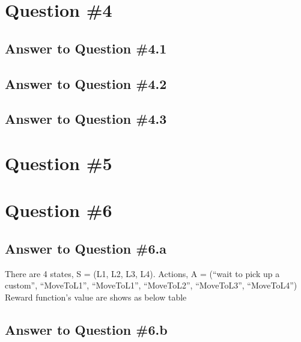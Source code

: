 \documentclass[conference]{styles/acmsiggraph}
\begin{document}
\section{Question \#4}

\subsection{Answer to Question \#4.1}

\subsection{Answer to Question \#4.2}

\subsection{Answer to Question \#4.3}

\section{Question \#5}

\section{Question \#6}

\subsection{Answer to Question \#6.a}

There are 4 states, S = (L1, L2, L3, L4).
Actions, A = (“wait to pick up a custom”, “MoveToL1”, “MoveToL1”, “MoveToL2”, “MoveToL3”, “MoveToL4”)
Reward function's value are shows as below table


\subsection{Answer to Question \#6.b}
\end{document}

